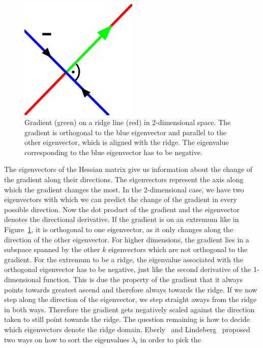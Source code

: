 \begin{figure}
  \centering
  \includegraphics[width=0.5\textwidth]{Images/ridgeEV.pdf}
  \caption{Gradient (green) on a ridge line (red) in 2-dimensional space.
  The gradient is orthogonal to the blue eigenvector and parallel to the
  other eigenvector, which is aligned with the ridge. The eigenvalue
  corresponding to the blue eigenvector has to be negative.}
  \label{fig:ridgeEV}
\end{figure}
The eigenvectors of the Hessian matrix give us information about
the change of the gradient along their directions. The eigenvectors
represent the axis along which the gradient changes the most. In the
2-dimensional case, we have two eigenvectors with which we can predict
the change of the gradient in every possible direction. Now the dot
product of the gradient and the eigenvector denotes the directional
derivative. If the gradient is on an extremum like in
Figure~\ref{fig:ridgeEV}, it is orthogonal to one eigenvector, as it
only changes along the direction of the other eigenvector. For higher
dimensions, the gradient lies in a subspace spanned by the other $k$
eigenvectors which are not orthogonal to the gradient. For the extremum
to be a ridge, the eigenvalue associated with the orthogonal eigenvector
has to be negative, just like the second derivative of the 1-dimensional
function. This is due the property of the gradient that it always points
towards greatest ascend and therefore always towards the ridge. If we
now step along the direction of the eigenvector, we step straight aways
from the ridge in both ways. Therefore the gradient gets negatively
scaled against the direction taken to still point towards the ridge. The
question remaining is how to decide which eigenvectors denote the ridge
domain. Eberly~\cite{Eberly} and Lindeberg~\cite{Lindeberg} proposed two
ways on how to sort the eigenvalues $\lambda_i$ in order to pick the
